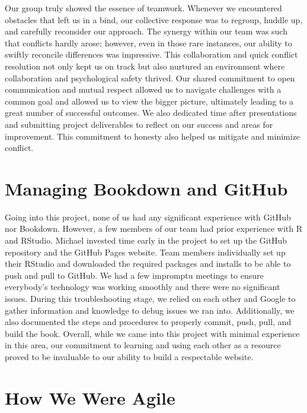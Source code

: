 \documentclass[
]{book}
\begin{document}
Our group truly showed the essence of teamwork. Whenever we encountered obstacles that left us in a bind, our collective response was to regroup, huddle up, and carefully reconsider our approach. The synergy within our team was such that conflicts hardly arose; however, even in those rare instances, our ability to swiftly reconcile differences was impressive. This collaboration and quick conflict resolution not only kept us on track but also nurtured an environment where collaboration and psychological safety thrived. Our shared commitment to open communication and mutual respect allowed us to navigate challenges with a common goal and allowed us to view the bigger picture, ultimately leading to a great number of successful outcomes. We also dedicated time after presentations and submitting project deliverables to reflect on our success and areas for improvement. This commitment to honesty also helped us mitigate and minimize conflict.

\hypertarget{managing-bookdown-and-github}{%
\section{Managing Bookdown and GitHub}\label{managing-bookdown-and-github}}

Going into this project, none of us had any significant experience with GitHub nor Bookdown. However, a few members of our team had prior experience with R and RStudio. Michael invested time early in the project to set up the GitHub repository and the GitHub Pages website. Team members individually set up their RStudio and downloaded the required packages and installs to be able to push and pull to GitHub. We had a few impromptu meetings to ensure everybody's technology was working smoothly and there were no significant issues. During this troubleshooting stage, we relied on each other and Google to gather information and knowledge to debug issues we ran into. Additionally, we also documented the steps and procedures to properly commit, push, pull, and build the book. Overall, while we came into this project with minimal experience in this area, our commitment to learning and using each other as a resource proved to be invaluable to our ability to build a respectable website.

\hypertarget{how-we-were-agile}{%
\section{How We Were Agile}\label{how-we-were-agile}}
\end{document}
